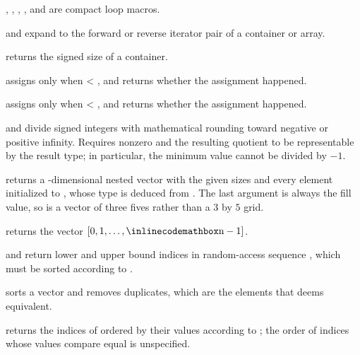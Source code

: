 \begin{compactitem}
  \item {}, , , , and  are compact loop macros.
  \item {} and  expand to the forward or reverse iterator pair of a container or array.
  \item {} returns the signed size of a container.
  \item {} assigns  only when  \textless{} , and returns whether the assignment happened.
  \item {} assigns  only when  \textless{} , and returns whether the assignment happened.
  \item {} and  divide signed integers with mathematical rounding toward negative or positive infinity. Requires nonzero  and the resulting quotient to be representable by the result type; in particular, the minimum value cannot be divided by $-1$.
  \item {} returns a -dimensional nested vector with the given sizes and every element initialized to , whose type is deduced from . The last argument is always the fill value, so  is a vector of three fives rather than a $3$ by $5$ grid.
  \item {} returns the vector $[0, 1, \ldots, {\inlinecodemath{n}} - 1]$.
  \item {} and  return lower and upper bound indices in random-access sequence , which must be sorted according to .
  \item {} sorts a vector and removes duplicates, which are the elements that  deems equivalent.
  \item {} returns the indices of  ordered by their values according to ; the order of indices whose values compare equal is unspecified.

\end{compactitem}
